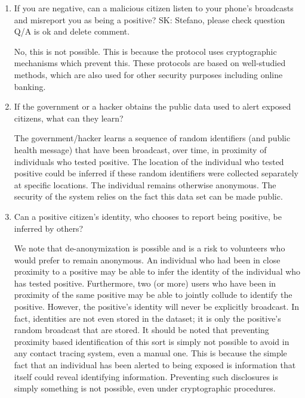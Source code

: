 \documentclass{article}
\newcommand{\TODO}[1]{ {\color{blue} #1 }}
\begin{document}
\begin{enumerate}[leftmargin=*]

\item If you are negative, can a malicious citizen listen to your phone's broadcasts and misreport you as being a positive?
\TODO{SK: Stefano, please check question Q/A is ok and delete comment.}
   
   No, this is not possible. This is because the protocol uses cryptographic mechanisms which prevent this. These protocols are based on well-studied methods, which are also used for other security purposes including online banking.


\item If the government or a hacker obtains the public data used to alert exposed citizens, what can they learn?

  The government/hacker learns a sequence of random identifiers (and public health message) that have been broadcast, over time, in proximity of individuals who tested positive. The location of the individual who tested positive could be inferred if these random identifiers were collected separately at specific locations. The individual remains otherwise anonymous. The security of the system relies on the fact this data set can be made public.


\item Can a positive citizen's identity, who chooses to report being positive, be inferred by others? 

We note that de-anonymization is possible and is a risk to volunteers who would prefer to remain anonymous. An individual who had been in close proximity to a positive may be able to infer the identity of the individual who has tested positive.  
Furthermore, two (or more) users who have been in proximity of the same positive may be able to jointly collude to identify the positive.
However, the positive's identity will never be explicitly broadcast. In fact, identities are not even stored in the dataset; it is only the positive's random broadcast that are stored.
It should be noted that preventing proximity based identification of this sort is simply not possible to avoid in any contact tracing system, even a manual one. This is because the simple fact that an individual has been alerted to being exposed is information that itself could reveal identifying information.  Preventing such disclosures is simply something is not possible, even under cryptographic procedures.


\end{enumerate}
\end{document}
